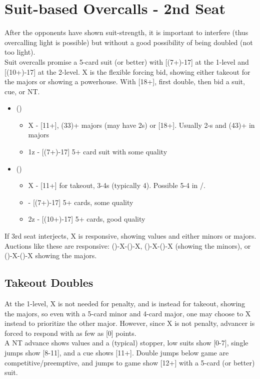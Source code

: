 \documentclass[12pt]{report}
\newcommand{\n}{\\}
\newcommand{\ul}[1]{\begin{itemize}#1\end{itemize}}
\newcommand{\li}{\item[~]}
\begin{document}
\section{Suit-based Overcalls - 2nd Seat} \label{4:2}

    After the opponents have shown suit-strength, it is important to interfere (thus overcalling light is possible) but without a good possibility of being doubled (not too light). \n

    Suit overcalls promise a 5-card suit (or better) with [(7+)-17] at the 1-level and [(10+)-17] at the 2-level.  X is the flexible forcing bid, showing either takeout for the majors or showing a powerhouse.  With [18+], first double, then bid a suit, cue, or NT.

    \ul {
        \li ()
        \ul {
            \li X - [11+], (33)+ majors (may have 2\di{}s) or [18+].  Usually 2-\cl{}s and (43)+ in majors
            \li 1z - [(7+)-17] 5+ card suit with some quality
        }
        \li (\he1)
        \ul {
            \li X - [11+] for takeout, 3-4\sp{}s (typically 4).  Possible 5-4 in \di{}/\sp{}.
            \li \sp1 - [(7+)-17] 5+ cards, some quality
            \li 2z - [(10+)-17] 5+ cards, good quality
        }
    }

    If 3rd seat interjects, X is responsive, showing values and either minors or majors.  Auctions like these are responsive: ()-X-()-X, ()-X-()-X (showing the minors), or ()-X-()-X showing the majors.

\subsection{Takeout Doubles}

    At the 1-level, X is not needed for penalty, and is instead for takeout, showing the majors, so even with a 5-card minor and 4-card major, one may choose to X instead to prioritize the other major. However, since X is not penalty, advancer is forced to respond with as few as [0] points.\n

    A NT advance shows values and a (typical) stopper, low suits show [0-7], single jumps show [8-11], and a cue shows [11+].  Double jumps below game are competitive/preemptive, and jumps to game show [12+] with a 5-card (or better) suit. \n
    
\end{document}
